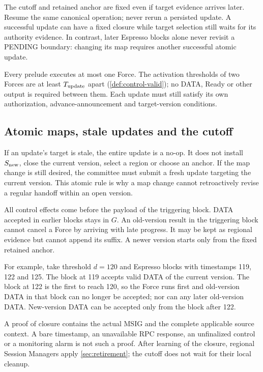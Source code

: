 \documentclass[11pt,a4paper]{article}
\begin{document}
The cutoff and retained anchor are fixed even if target evidence arrives
later. Resume the same canonical operation; never rerun a persisted
update. A successful update can have a fixed closure while target
selection still waits for its authority evidence. In contrast, later
Espresso blocks alone never revisit a PENDING boundary: changing its map
requires another successful atomic update.

Every prelude executes at most one Force. The activation thresholds of
two Forces are at least $T_{\rm update}$ apart
(\cref{def:control-valid}); no DATA, Ready or other output is required
between them.
Each update must still satisfy its own authorization,
advance-announcement and target-version conditions.

\subsection{Atomic maps, stale updates and the cutoff}
If an update's target is stale, the entire update is a no-op. It does not
install $S_{\rm new}$, close the current version, select a region or
choose an anchor. If the map change is still desired, the committee must
submit a fresh update targeting the current version. This atomic rule is
why a map change cannot retroactively revise a regular handoff within an
open version.

All control effects come before the payload of the triggering block.
DATA accepted in earlier blocks stays in $G$. An old-version result in
the triggering block cannot cancel a Force by arriving with late
progress. It may be kept as regional evidence but cannot append its
suffix. A newer version starts only from the fixed retained anchor.

For example, take threshold $d=120$ and Espresso blocks with timestamps
119, 122 and 125. The block at 119 accepts valid DATA of the current
version. The block at 122 is the first to reach 120, so the Force runs
first and old-version DATA in that block can no longer be accepted;
nor can any later old-version DATA. New-version DATA can be accepted only
from the block after 122.

A proof of closure contains the actual MSIG and the complete applicable
source context. A bare timestamp, an unavailable RPC response, an
unfinalized control or a monitoring alarm is not such a proof. After
learning of the closure, regional Session Managers apply
\cref{sec:retirement}; the cutoff does not wait for their local cleanup.
\end{document}
